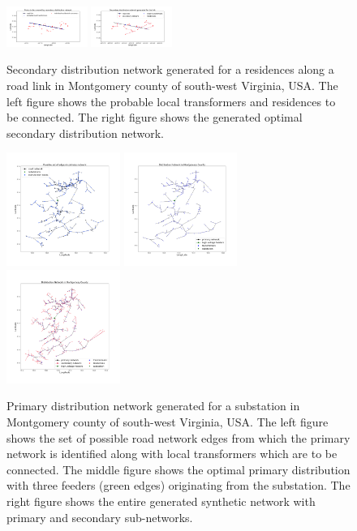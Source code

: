 \documentclass[sigconf]{acmart}
\begin{document}
\begin{figure}
	\centering
	\includegraphics[width=0.235\textwidth]{figs/secnet-base.png}
	\includegraphics[width=0.235\textwidth]{figs/secnet-result.png}
	\caption{Secondary distribution network generated for a residences along a road link in Montgomery county of south-west Virginia, USA. The left figure shows the probable local transformers and residences to be connected. The right figure shows the generated optimal secondary distribution network.}
	\label{fig:secondary}
\end{figure}
\begin{figure}[htb]
	\centering
	\includegraphics[width=0.33\textwidth]{figs/24664-master.png}
	\includegraphics[width=0.33\textwidth]{figs/24664-primarytest.png}
	\includegraphics[width=0.33\textwidth]{figs/24664-networktest.png}
	\caption{Primary distribution network generated for a substation in Montgomery county of south-west Virginia, USA. The left figure shows the set of possible road network edges from which the primary network is identified along with local transformers which are to be connected. The middle figure shows the optimal primary distribution with three feeders (green edges) originating from the substation. The right figure shows the entire generated synthetic network with primary and secondary sub-networks.}
	\label{fig:primary}
\end{figure}
\end{document}
